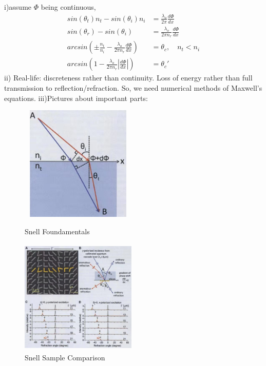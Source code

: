 \documentclass[]{article}
\begin{document}
\begin{enumerate}
\begin{enumerate}
			i)assume $\Phi$ being continuous, 
			\begin{align*}
				sin(\theta_t)n_t - sin(\theta_i)n_i &= \frac{\lambda_o}{2\pi}\frac{d \Phi}{dx}\\
				sin(\theta_r) - sin(\theta_i) &= \frac{\lambda_o}{2\pi n_r}\frac{d \Phi}{dx}\\
				arcsin(\pm \frac{n_t}{n_i} - \frac{\lambda_o}{2\pi n_r}\frac{d \Phi}{dx})  &= \theta_c , \quad n_t<n_i\\
				arcsin(1 - \frac{\lambda_o}{2\pi n_r}|\frac{d \Phi}{dx}|)  &= \theta_c'
			\end{align*}
		ii) Real-life: discreteness rather than continuity. Loss of energy rather than full transmission to reflection/refraction. So, we need numerical methods of Maxwell's equations.
		iii)Pictures about important parts:
	\begin{figure}[h]
		\begin{minipage}[t]{0.45\linewidth}
			\centering
			\includegraphics[width=5.5cm,height=5.5cm]{Fig/Snel0.jpg}
			\caption{Snell Foundamentals}
		\end{minipage}
		\begin{minipage}[t]{0.45\linewidth}        %
			\hspace{2mm}
			\includegraphics[width=5.5cm,height=5.5cm]{Fig/Snel1.jpg}
			\caption{Snell Sample Comparison}
		\end{minipage}
	\end{figure}

\end{enumerate}
\end{enumerate}
\end{document}
